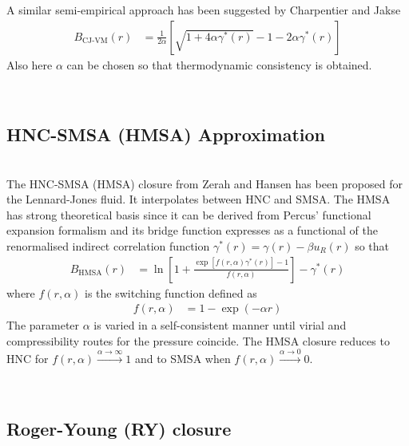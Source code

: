 A similar semi-empirical approach has been suggested by Charpentier and Jakse
\cite{Charpentier2001}
\begin{align}
B_\text{CJ-VM}(r) &= \frac{1}{2\alpha}\left[\sqrt{1+4\alpha
\gamma^*(r)}-1-2\alpha\gamma^*(r) \right]
\end{align}
Also here $\alpha$ can be chosen so that thermodynamic consistency is obtained.




~\\
\subsection{HNC-SMSA (HMSA) Approximation}
~\\

The HNC\hbox{-}SMSA (HMSA) closure from Zerah and Hansen  \cite{Zerah1986} has been proposed
for the Lennard-Jones fluid. It interpolates between HNC and SMSA. The HMSA has
strong theoretical basis since it can be derived from Percus' functional expansion
formalism and its bridge function expresses as a functional of the renormalised
indirect correlation function $\gamma^*(r)=\gamma(r)-\beta u_{R}(r)$ so that
\begin{align}
B_\text{HMSA}(r) &= \ln
\left[1+\frac{\exp\left[f(r,\alpha)\gamma^*(r)\right]-1}{f(r,\alpha)}\right]-\gamma^*(r)
\end{align}
where $f(r,\alpha)$ is the switching function defined as
\begin{align}
f(r,\alpha) &= 1-\exp(-\alpha r)
\end{align}
The parameter $\alpha$ is varied in a self-consistent manner until virial and
compressibility routes for the pressure coincide.
The HMSA closure reduces to HNC for $f(r,\alpha) \xrightarrow{\alpha\rightarrow\infty} 1$
and to SMSA when $f(r,\alpha) \xrightarrow{\alpha\rightarrow 0} 0$.

\vphantom{.}~\\
\subsection{Roger-Young (RY) closure}
~\\

